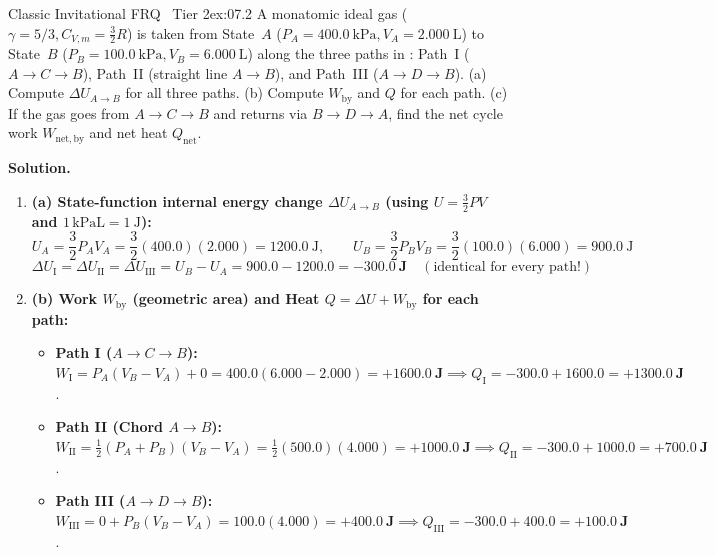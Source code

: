 \par\smallskip

\begin{workedexample}{Classic Invitational FRQ \textbar\ Tier 2}{ex:07.2}
A monatomic ideal gas ($\gamma = 5/3, C_{V,m} = \frac{3}{2}R$) is taken from State~$A$ ($P_A = \SI{400.0}{\kilo\pascal}, V_A = \SI{2.000}{\liter}$) to State~$B$ ($P_B = \SI{100.0}{\kilo\pascal}, V_B = \SI{6.000}{\liter}$) along the three paths in : Path~I ($A\to C\to B$), Path~II (straight line $A\to B$), and Path~III ($A\to D\to B$). (a) Compute $\Delta U_{A\to B}$ for all three paths. (b) Compute $W_{\mathrm{by}}$ and $Q$ for each path. (c) If the gas goes from $A\to C\to B$ and returns via $B\to D\to A$, find the net cycle work $W_{\mathrm{net,by}}$ and net heat $Q_{\mathrm{net}}$.
\par\smallskip\noindent
\textbf{Solution.}
\begin{enumerate}
  \item \textbf{(a) State-function internal energy change $\Delta U_{A\to B}$ (using $U = \frac{3}{2}PV$ and $1\,\si{\kilo\pascal\liter} = \SI{1}{\joule}$):}
  \[
    U_A = \frac{3}{2}P_A V_A = \frac{3}{2}(400.0)(2.000) = \SI{1200.0}{\joule}, \qquad U_B = \frac{3}{2}P_B V_B = \frac{3}{2}(100.0)(6.000) = \SI{900.0}{\joule}
  \]
  \[
    \Delta U_{\mathrm{I}} = \Delta U_{\mathrm{II}} = \Delta U_{\mathrm{III}} = U_B - U_A = 900.0 - 1200.0 = \mathbf{\SI{-300.0}{\joule}} \quad (\text{identical for every path!})
  \]
  \item \textbf{(b) Work $W_{\mathrm{by}}$ (geometric area) and Heat $Q = \Delta U + W_{\mathrm{by}}$ for each path:}
  \begin{itemize}
    \item \textbf{Path I ($A\to C\to B$):} $W_{\mathrm{I}} = P_A(V_B - V_A) + 0 = 400.0(6.000 - 2.000) = \mathbf{+\SI{1600.0}{\joule}} \implies Q_{\mathrm{I}} = -300.0 + 1600.0 = \mathbf{+\SI{1300.0}{\joule}}$.
    \item \textbf{Path II (Chord $A\to B$):} $W_{\mathrm{II}} = \frac{1}{2}(P_A + P_B)(V_B - V_A) = \frac{1}{2}(500.0)(4.000) = \mathbf{+\SI{1000.0}{\joule}} \implies Q_{\mathrm{II}} = -300.0 + 1000.0 = \mathbf{+\SI{700.0}{\joule}}$.
    \item \textbf{Path III ($A\to D\to B$):} $W_{\mathrm{III}} = 0 + P_B(V_B - V_A) = 100.0(4.000) = \mathbf{+\SI{400.0}{\joule}} \implies Q_{\mathrm{III}} = -300.0 + 400.0 = \mathbf{+\SI{100.0}{\joule}}$.
  \end{itemize}

\end{enumerate}
\end{workedexample}
